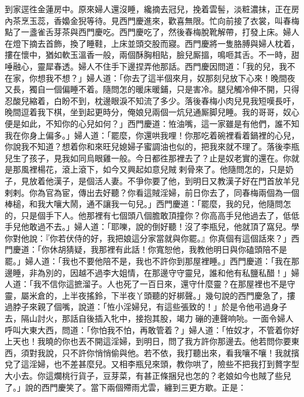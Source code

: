 到家逕徃金蓮房中。原來婦人還沒睡，纔摘去冠兒，挽着雲髻，淡粧濃抹，正在房內茶烹玉蕊，香嬝金猊等待。見西門慶進來，歡喜無限。忙向前接了衣裳，叫春梅點了一盞雀舌芽茶與西門慶吃。西門慶吃了，然後春梅脫靴解帶，打發上床。婦人在燈下摘去首飾，換了睡鞋，上床並頭交股而寢。西門慶將一隻胳膊與婦人枕着，摟在懷中，猶如軟玉溫香一般，兩個酥胸相貼，臉兒厮搵，鳴咂其舌。不一時，甜唾融心，靈犀春透。婦人不住手下邊捏弄他那話。西門慶因問道：「我的兒，我不在家，你想我不想？」婦人道：「你去了這半個來月，奴那刻兒放下心來！晚間夜又長，獨自一個偏睡不着。隨問怎的暖床暖鋪，只是害冷。{}{}腿兒觸冷伸不開，只得忍酸兒縮着，白盼不到，枕邊眼淚不知流了多少。落後春梅小肉兒見我短嘆長吁，晚間逗着我下棋，坐到起更時分，俺娘兒兩個一炕兒通厮脚兒睡。我的哥哥，奴心便是如此，不知你的心兒如何？」西門慶道：恠油嘴，這一家雖是有他們，誰不知我在你身上偏多。」{}婦人道：「罷麼，你還哄我哩！你那吃着碗裡看着鍋裡的心兒，你說我不知道？想着你和來旺兒媳婦子蜜調油也似的，把我來就不理了。落後李瓶兒生了孩子，見我如同烏眼雞一般。今日都徃那裡去了？止是奴老實的還在。{}你就是那風裡楊花，滾上滾下，如今又興起如意兒賊𢱉剌骨來了。他隨問怎的，只是奶子，見放着他漢子，是個活人妻。不爭你要了他，到明日又教漢子好在門首放羊兒剌剌。你為官為宦，傳出去好聽？你看這賊淫婦，前日你去了，同春梅兩個為一個棒槌，和我大嚷大鬧，通不讓我一句兒。」西門慶道：「罷麼，我的兒，他隨問怎的，只是個手下人。他那裡有七個頭八個膽敢頂撞你？你高高手兒他過去了，低低手兒他敢過不去。」{}婦人道：「耶嚛，說的倒好聽！沒了李瓶兒，他就頂了窩兒。學你對他說：『你若伏侍的好，我把娘這分家當就與你罷。』你真個有這個話來？」{}西門慶道：「你休胡猜疑，我那裡有此話！你寬恕他，我教他明日與你磕頭陪不是罷。」婦人道：「我也不要他陪不是，我也不許你到那屋裡睡。」西門慶道：「我在那邊睡，非為別的，因越不過李大姐情，在那邊守守靈兒，誰和他有私鹽私醋！」婦人道：「我不信你這摭溜子。人也死了一百日來，還守什麼靈？在那屋裡也不是守靈，屬米倉的，上半夜搖鈴，下半夜丫頭聽的好梆聲。」幾句說的西門慶急了，摟過脖子來親了個嘴，說道：「恠小淫婦兒，有這些張致的！」於是令他弔過身子去，隔山討火，那話自後插入牝中，接抱其股，竭力𢵞磞的連聲响喨。一面令婦人呼叫大東大西，問道：「你怕我不怕，再敢管着？」婦人道：「恠奴才，不管着你好上天也！我曉的你也丟不開這淫婦，到明日，問了我方許你那邊去。他若問你要東西，須對我說，只不許你悄悄偷與他。若不依，我打聽出來，看我嚷不嚷！我就擯兌了這淫婦，也不差甚麼兒。又相李瓶兒來頭，教你哄了，險些不把我打到贅字型大小去。{}你這爛桃行貨子，豆芽菜，有甚正條捆兒也怎的？老娘如今也賊了些兒了。」{}說的西門慶笑了。當下兩個殢雨尤雲，纏到三更方歇。正是：

